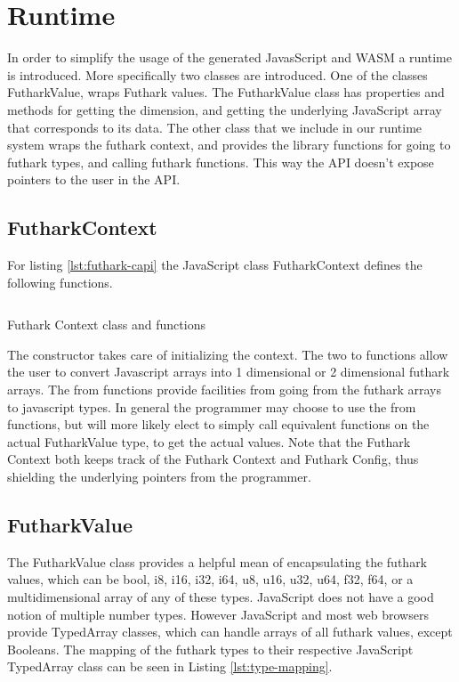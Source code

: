 \documentclass[11pt]{book}
\begin{document}
\section{Runtime}
In order to simplify the usage of the generated JavasScript and WASM a runtime is introduced. More specifically two classes are introduced. One of the classes FutharkValue, wraps Futhark values. The FutharkValue class has properties and methods for getting the dimension, and getting the underlying JavaScript array that corresponds to its data. The other class that we include in our runtime system wraps the futhark context, and provides the library functions for going to futhark types, and calling futhark functions. This way the API doesn't expose pointers to the user in the API. 


\subsection{FutharkContext}

For listing \ref{lst:futhark-capi} the JavaScript class FutharkContext defines the following functions.

\begin{listing}[H] 
        \inputminted[fontsize=\small,baselinestretch=0.5,linenos]{javascript}{code/compiler/c-backend/libnames.js}
        \caption{Futhark Context class and functions}
        \label{lst:jsapi}    
\end{listing} 
The constructor takes care of initializing the context. The two to functions allow the user to convert Javascript arrays into 1 dimensional or 2 dimensional futhark arrays. The from functions provide facilities from going from the futhark arrays to javascript types. In general the programmer may choose to use the from functions, but will more likely elect to simply call equivalent functions on the actual FutharkValue type, to get the actual values. Note that the Futhark Context both keeps track of the Futhark Context and Futhark Config, thus shielding the underlying pointers from the programmer.


\subsection{FutharkValue}

The FutharkValue class provides a helpful mean of encapsulating the futhark values, which can be
bool, i8, i16, i32, i64, u8, u16, u32, u64, f32, f64, or a multidimensional array of any of these types. JavaScript does not have a good notion of multiple number types. However JavaScript and most web browsers provide TypedArray classes, which can handle arrays of all futhark values, except Booleans. The mapping of the futhark types to their respective JavaScript TypedArray class can be seen in Listing \ref{lst:type-mapping}.
\end{document}
